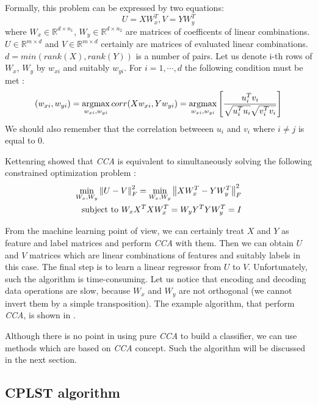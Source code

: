 Formally, this problem can be expressed by two equations:
\begin{equation}\label{eq:cca1}
    U=XW_x^T,   V=YW_y^T    
\end{equation}
where $W_x \in \mathbb{R}^{d \times n_1}$, $W_y \in \mathbb{R}^{d \times n_2}$ are matrices of coefficents of linear combinations. $U \in \mathbb{R}^{m \times d}$ and $V \in \mathbb{R}^{m \times d}$ certainly are matrices of evaluated linear combinations. $d=min(rank(X), rank(Y))$ is a number of pairs. Let us denote i-th rows of $W_x$, $W_y$ by $w_{xi}$ and suitably $w_{yi}$. For $i=1,\cdots,d$ the following condition must be met \cite{William}:
\begin{equation}\label{eq:cca2}
    (w_{xi}, w_{yi})=\operatorname*{argmax}_{w_{xi}, w_{yi}} corr(Xw_{xi}, Yw_{yi}) = \operatorname*{argmax}_{w_{xi}, w_{yi}} \left[\frac{u^{T}_iv_i}{\sqrt{u^T_iu_i}\sqrt{v^{T}_iv_i}}\right] 
\end{equation}
We should also remember that the correlation betweeen $u_i$ and $v_i$ where $i\neq j$ is equal to $0$.

Kettenring showed that \textit{CCA} is equivalent to simultaneously solving the following constrained optimization problem \cite{ChenLin}:
\begin{equation}\label{eq:cca3}
\begin{split}
    \min_{W_x, W_y} \left\lVert U-V\right\rVert_{F}^2 = \min_{W_x, W_y} \left\lVert XW_x^T-YW_y^T\right\rVert_{F}^2 \\ 
    \text{   subject to   } W_xX^TXW_x^T=W_yY^TYW_y^T=I   
\end{split}
\end{equation}

From the machine learning point of view, we can certainly treat $X$ and $Y$ as feature and label matrices and perform \textit{CCA} with them. Then we can obtain $U$ and $V$ matrices which are linear combinations of features and suitably labels in this case. The final step is to learn a linear regressor from $U$ to $V$. Unfortunately, such the algorithm is time-consuming. Let us notice that encoding and decoding data operations are slow, because $W_x$ and $W_y$ are not orthogonal (we cannot invert them by a simple transposition). The example algorithm, that perform \textit{CCA}, is shown in . 

Although there is no point in using pure \textit{CCA} to build a classifier, we can use methods which are based on \textit{CCA} concept. Such the algorithm will be discussed in the next section.

\subsection{CPLST algorithm}

